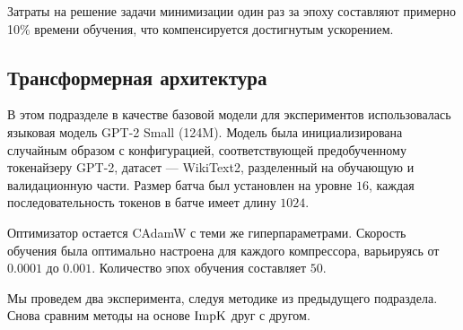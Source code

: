     Затраты на решение задачи минимизации один раз за эпоху составляют примерно 10\% времени обучения, что компенсируется достигнутым ускорением.

\subsection{Трансформерная архитектура}
    В этом подразделе в качестве базовой модели для экспериментов использовалась языковая модель GPT-2 Small (124M). Модель была инициализирована случайным образом с конфигурацией, соответствующей предобученному токенайзеру GPT-2, датасет — WikiText2, разделенный на обучающую и валидационную части. Размер батча был установлен на уровне $16$, каждая последовательность токенов в батче имеет длину $1024$.

    Оптимизатор остается CAdamW с теми же гиперпараметрами. Скорость обучения была оптимально настроена для каждого компрессора, варьируясь от $0.0001$ до $0.001$. Количество эпох обучения составляет $50$.

    Мы проведем два эксперимента, следуя методике из предыдущего подраздела. Снова сравним методы на основе $\operatorname{ImpK}$ друг с другом.

